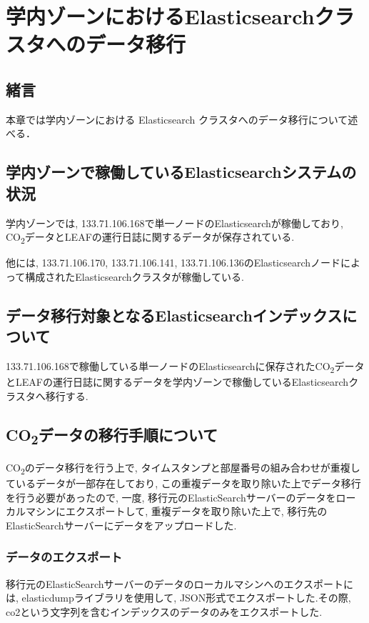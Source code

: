 
\chapter{学内ゾーンにおけるElasticsearchクラスタへのデータ移行}
\label{chap:second}

\section{緒言}
本章では学内ゾーンにおける Elasticsearch クラスタへのデータ移行について述べる．

\section{学内ゾーンで稼働しているElasticsearchシステムの状況}
学内ゾーンでは, 133.71.106.168で単一ノードのElasticsearchが稼働しており, CO\textsubscript{2}データとLEAFの運行日誌に関するデータが保存されている.

他には, 133.71.106.170, 133.71.106.141, 133.71.106.136のElasticsearchノードによって構成されたElasticsearchクラスタが稼働している.

\section{データ移行対象となるElasticsearchインデックスについて}

133.71.106.168で稼働している単一ノードのElasticsearchに保存されたCO\textsubscript{2}データとLEAFの運行日誌に関するデータを学内ゾーンで稼働しているElasticsearchクラスタへ移行する.

\section{CO\textsubscript{2}データの移行手順について}

CO\textsubscript{2}のデータ移行を行う上で, タイムスタンプと部屋番号の組み合わせが重複しているデータが一部存在しており, この重複データを取り除いた上でデータ移行を行う必要があったので, 一度, 移行元のElasticSearchサーバーのデータをローカルマシンにエクスポートして, 重複データを取り除いた上で, 移行先のElasticSearchサーバーにデータをアップロードした.

\subsection{データのエクスポート}
移行元のElasticSearchサーバーのデータのローカルマシンへのエクスポートには, elasticdumpライブラリを使用して, JSON形式でエクスポートした.その際, co2という文字列を含むインデックスのデータのみをエクスポートした.

